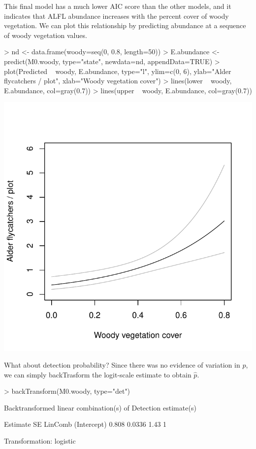 \documentclass[a4paper]{article}
\renewenvironment{Schunk}{\vspace{\topsep}}{\vspace{\topsep}}
\begin{document}
This final model has a much lower AIC score than the other models, and
it indicates
that ALFL abundance increases with the percent cover
of woody vegetation. We can plot this relationship by predicting
abundance at a sequence of woody vegetation values.

\begin{Schunk}
\begin{Sinput}
> nd <- data.frame(woody=seq(0, 0.8, length=50))
> E.abundance <- predict(M0.woody, type="state", newdata=nd, appendData=TRUE)
> plot(Predicted ~ woody, E.abundance, type="l", ylim=c(0, 6),
      ylab="Alder flycatchers / plot", xlab="Woody vegetation cover")
> lines(lower ~ woody, E.abundance, col=gray(0.7))
> lines(upper ~ woody, E.abundance, col=gray(0.7))
\end{Sinput}
\end{Schunk}
\includegraphics{cap-recap-012}


What about detection probability? Since there was no evidence of
variation in $p$, we can simply backTrasform the logit-scale estimate
to obtain $\hat{p}$.

\begin{Schunk}
\begin{Sinput}
> backTransform(M0.woody, type="det")
\end{Sinput}
\begin{Soutput}
Backtransformed linear combination(s) of Detection estimate(s)

 Estimate     SE LinComb (Intercept)
    0.808 0.0336    1.43           1

Transformation: logistic 
\end{Soutput}
\end{Schunk}
\end{document}
